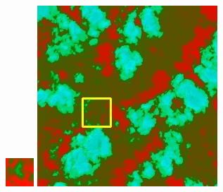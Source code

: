 \documentclass[10pt,UTF8,fntef]{ctexart}
\begin{document}
\begin{multicols}{2}
\begin{figure}[H]
{\begin{minipage}[b]{0.15\linewidth}
            \includegraphics[width=1\linewidth]{../log/spoon4/cut/tmp_cut_LC80460282014171LGN00_12556_spectral.jpg}\vspace{4pt}
            \includegraphics[width=1\linewidth]{../log/spoon4/cut/LC80980712014024LGN00_15440_spectral.jpg}\vspace{4pt}

\end{minipage}}
\end{figure}
\end{multicols}
\end{document}
